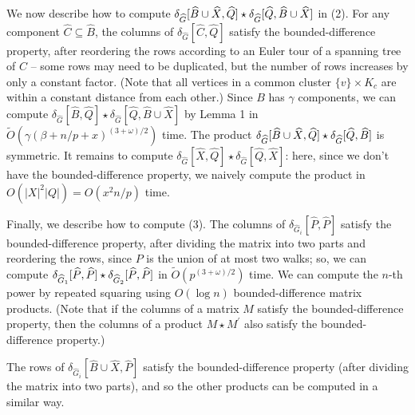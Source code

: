 \par
\par
We now describe how to compute $\delta_{\widehat{G}}[\widehat{B}\cup\widehat{X},\widehat{Q}]\star\delta_{%
\widehat{G}}[\widehat{Q},\widehat{B}\cup\widehat{X}]$ in (2). For any component $\widehat{C}\subseteq\widehat{B}$, the columns of $\delta_{\widehat{G}}[\widehat{C},\widehat{Q}]$ satisfy the bounded-difference property, after reordering the rows according to an Euler tour of a spanning tree of $C$ – some rows may need to be duplicated, but the number of rows increases by only a constant factor. (Note that all vertices in a common cluster $\{v\}\times K_{c}$ are within a constant distance from each other.) Since $B$ has $\gamma$ components, we can compute $\delta_{\widehat{G}}[\widehat{B},\widehat{Q}]\star\delta_{\widehat{G}}[%
\widehat{Q},\widehat{B}\cup\widehat{X}]$ by Lemma 1 in $\widetilde{O}(\gamma(\beta+n/p+x)^{(3+\omega)/2})$ time. The product $\delta_{\widehat{G}}[\widehat{B}\cup\widehat{X},\widehat{Q}]\star\delta_{%
\widehat{G}}[\widehat{Q},\widehat{B}]$ is symmetric. It remains to compute $\delta_{\widehat{G}}[\widehat{X},\widehat{Q}]\star\delta_{\widehat{G}}[%
\widehat{Q},\widehat{X}]$: here, since we don’t have the bounded-difference property, we naively compute the product in $O(|X|^{2}|Q|)=O(x^{2}n/p)$ time.
\par
\par
Finally, we describe how to compute (3). The columns of $\delta_{{\widehat{G}}_{i}}[\widehat{P},\widehat{P}]$ satisfy the bounded-difference property, after dividing the matrix into two parts and reordering the rows, since $P$ is the union of at most two walks; so, we can compute $\delta_{{\widehat{G}}_{1}}[\widehat{P},\widehat{P}]\star\delta_{{\widehat{G}}_%
{2}}[\widehat{P},\widehat{P}]$ in $\widetilde{O}(p^{(3+\omega)/2})$ time. We can compute the $n$-th power by repeated squaring using $O(\log n)$ bounded-difference matrix products. (Note that if the columns of a matrix $M$ satisfy the bounded-difference property, then the columns of a product $M\star M^{\prime}$ also satisfy the bounded-difference property.)
\par
\par
The rows of $\delta_{{\widehat{G}}_{i}}[\widehat{B}\cup\widehat{X},\widehat{P}]$ satisfy the bounded-difference property (after dividing the matrix into two parts), and so the other products can be computed in a similar way.
